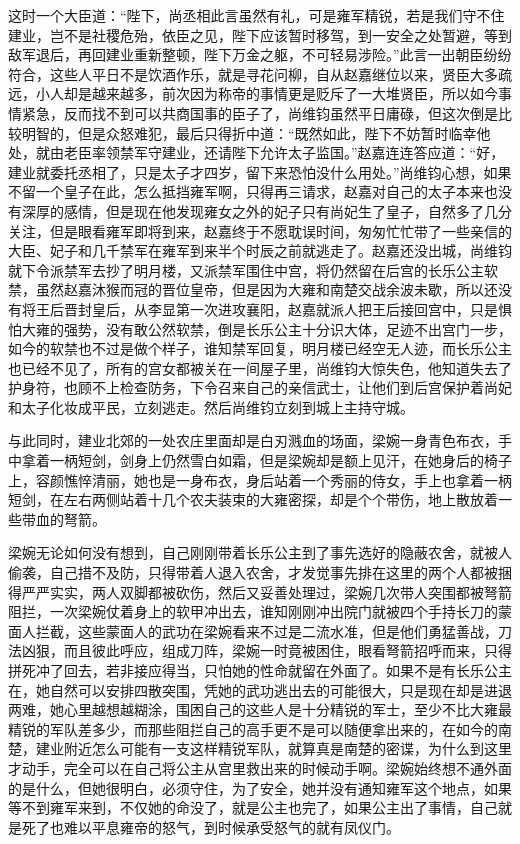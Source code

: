 这时一个大臣道：“陛下，尚丞相此言虽然有礼，可是雍军精锐，若是我们守不住建业，岂不是社稷危殆，依臣之见，陛下应该暂时移驾，到一安全之处暂避，等到敌军退后，再回建业重新整顿，陛下万金之躯，不可轻易涉险。”此言一出朝臣纷纷符合，这些人平日不是饮酒作乐，就是寻花问柳，自从赵嘉继位以来，贤臣大多疏远，小人却是越来越多，前次因为称帝的事情更是贬斥了一大堆贤臣，所以如今事情紧急，反而找不到可以共商国事的臣子了，尚维钧虽然平日庸碌，但这次倒是比较明智的，但是众怒难犯，最后只得折中道：“既然如此，陛下不妨暂时临幸他处，就由老臣率领禁军守建业，还请陛下允许太子监国。”赵嘉连连答应道：“好，建业就委托丞相了，只是太子才四岁，留下来恐怕没什么用处。”尚维钧心想，如果不留一个皇子在此，怎么抵挡雍军啊，只得再三请求，赵嘉对自己的太子本来也没有深厚的感情，但是现在他发现雍女之外的妃子只有尚妃生了皇子，自然多了几分关注，但是眼看雍军即将到来，赵嘉终于不愿耽误时间，匆匆忙忙带了一些亲信的大臣、妃子和几千禁军在雍军到来半个时辰之前就逃走了。赵嘉还没出城，尚维钧就下令派禁军去抄了明月楼，又派禁军围住中宫，将仍然留在后宫的长乐公主软禁，虽然赵嘉沐猴而冠的晋位皇帝，但是因为大雍和南楚交战余波未歇，所以还没有将王后晋封皇后，从李显第一次进攻襄阳，赵嘉就派人把王后接回宫中，只是惧怕大雍的强势，没有敢公然软禁，倒是长乐公主十分识大体，足迹不出宫门一步，如今的软禁也不过是做个样子，谁知禁军回复，明月楼已经空无人迹，而长乐公主也已经不见了，所有的宫女都被关在一间屋子里，尚维钧大惊失色，他知道失去了护身符，也顾不上检查防务，下令召来自己的亲信武士，让他们到后宫保护着尚妃和太子化妆成平民，立刻逃走。然后尚维钧立刻到城上主持守城。

与此同时，建业北郊的一处农庄里面却是白刃溅血的场面，梁婉一身青色布衣，手中拿着一柄短剑，剑身上仍然雪白如霜，但是梁婉却是额上见汗，在她身后的椅子上，容颜憔悴清丽，她也是一身布衣，身后站着一个秀丽的侍女，手上也拿着一柄短剑，在左右两侧站着十几个农夫装束的大雍密探，却是个个带伤，地上散放着一些带血的弩箭。

梁婉无论如何没有想到，自己刚刚带着长乐公主到了事先选好的隐蔽农舍，就被人偷袭，自己措不及防，只得带着人退入农舍，才发觉事先排在这里的两个人都被捆得严严实实，两人双脚都被砍伤，然后又妥善处理过，梁婉几次带人突围都被弩箭阻拦，一次梁婉仗着身上的软甲冲出去，谁知刚刚冲出院门就被四个手持长刀的蒙面人拦截，这些蒙面人的武功在梁婉看来不过是二流水准，但是他们勇猛善战，刀法凶狠，而且彼此呼应，组成刀阵，梁婉一时竟被困住，眼看弩箭招呼而来，只得拼死冲了回去，若非接应得当，只怕她的性命就留在外面了。如果不是有长乐公主在，她自然可以安排四散突围，凭她的武功逃出去的可能很大，只是现在却是进退两难，她心里越想越糊涂，围困自己的这些人是十分精锐的军士，至少不比大雍最精锐的军队差多少，而那些阻拦自己的高手更不是可以随便拿出来的，在如今的南楚，建业附近怎么可能有一支这样精锐军队，就算真是南楚的密谍，为什么到这里才动手，完全可以在自己将公主从宫里救出来的时候动手啊。梁婉始终想不通外面的是什么，但她很明白，必须守住，为了安全，她并没有通知雍军这个地点，如果等不到雍军来到，不仅她的命没了，就是公主也完了，如果公主出了事情，自己就是死了也难以平息雍帝的怒气，到时候承受怒气的就有凤仪门。

